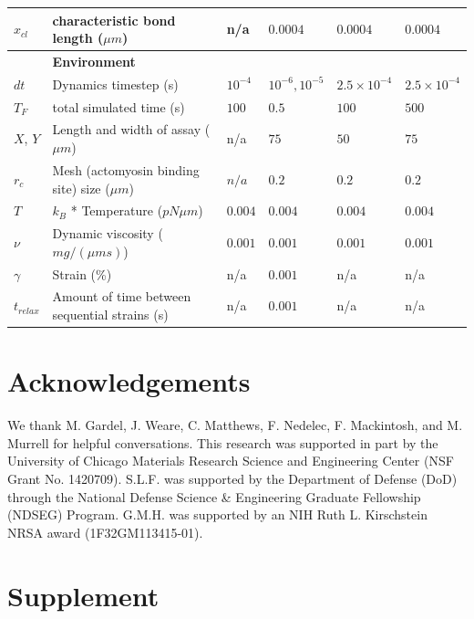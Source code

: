 \documentclass[12pt]{article}
\newcommand{\beginsupplement}{%
  \setcounter{table}{0}
  \renewcommand{\thetable}{S\arabic{table}}%
  \setcounter{figure}{0}
  \renewcommand{\thefigure}{S\arabic{figure}}%
}
\begin{document}
\begin{table}
\begin{tabular}{|C{1cm}|L{6cm}|C{2cm}|C{2cm}|C{2cm}|C{2cm}|}
    $x_{cl}$& characteristic bond length ($\mu m$) & n/a & $0.0004$ & $0.0004$ & $0.0004$ \\
    \hline
    &\bf{Environment} & & \\
    \hline
    $dt$ & Dynamics timestep (s) & $10^{-4}$ & $10^{-6},10^{-5}$ &$2.5\times10^{-4}$ &$2.5\times10^{-4}$ \\
    $T_F$& total simulated time (s) & $100$ & $0.5$ & $100$ & $500$ \\
    $X$, $Y$ & Length and width of assay ($\mu m$)& n/a & $75$ & $50$ & $75$\\
    $r_c$ & Mesh (actomyosin binding site) size ($\mu m$) & $n/a$ & $0.2 $ & $0.2 $& $0.2 $ \\ 
    $T$ & $k_B$ * Temperature ($pN\mu m$)& $0.004$ & $0.004$& $0.004$& $0.004$\\
    $\nu$ & Dynamic viscosity ($mg/(\mu m s)$) & $0.001$& $0.001$& $0.001$& $0.001$\\
    $\gamma$ & Strain (\%) \cite{stricker2010}& n/a& $0.001$&n/a&n/a\\
    $t_{relax}$ & Amount of time between sequential strains (s)& n/a& $0.001$ &n/a&n/a\\
    \hline
  \end{tabular}
  \label{tab:params}
\end{table}



\section{Acknowledgements}  
We thank M. Gardel, J. Weare, C. Matthews, F. Nedelec, F. Mackintosh, and M. Murrell for helpful conversations. This research was supported in part by the University of Chicago Materials Research Science and Engineering Center (NSF Grant No. 1420709). S.L.F. was supported by the Department of Defense (DoD) through the National Defense Science \& Engineering Graduate Fellowship (NDSEG) Program. G.M.H. was supported by an NIH Ruth L. Kirschstein NRSA award (1F32GM113415-01).



\beginsupplement
\section{Supplement}
\end{document}
